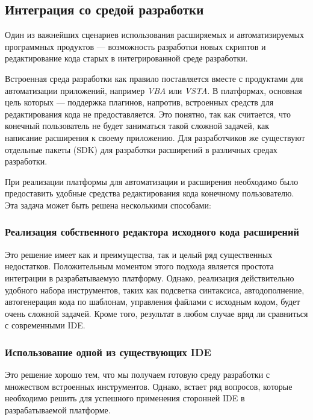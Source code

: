 \subsection{Интеграция со средой разработки}
\label{sec:ide-integration}

Один из важнейших сценариев использования расширяемых и автоматизируемых программных продуктов --- возможность разработки новых скриптов и редактирование кода старых в интегрированной среде разработки.

Встроенная среда разработки как правило поставляется вместе с продуктами для автоматизации приложений, например {\it VBA} или {\it VSTA}. В платформах, основная цель которых --- поддержка плагинов, напротив, встроенных средств для редактирования кода не предоставляется. Это понятно, так как считается, что конечный пользователь не будет заниматься такой сложной задачей, как написание расширения к своему приложению. Для разработчиков же существуют отдельные пакеты (SDK) для разработки расширений в различных средах разработки.

При реализации платформы для автоматизации и расширения необходимо было предоставить удобные средства редактирования кода конечному пользователю. Эта задача может быть решена несколькими способами:

\subsubsection{Реализация собственного редактора исходного кода расширений}

Это решение имеет как и преимущества, так и целый ряд существенных недостатков. Положительным моментом этого подхода является простота интеграции в разрабатываемую платформу. Однако, реализация действительно удобного набора инструментов, таких как подсветка синтаксиса, автодополнение, автогенерация кода по шаблонам, управления файлами с исходным кодом, будет очень сложной задачей. Кроме того, результат в любом случае вряд ли сравниться с современными IDE.

\subsubsection{Использование одной из существующих IDE}

Это решение хорошо тем, что мы получаем готовую среду разработки с множеством встроенных инструментов. Однако, встает ряд вопросов, которые необходимо решить для успешного применения сторонней IDE в разрабатываемой платформе.

